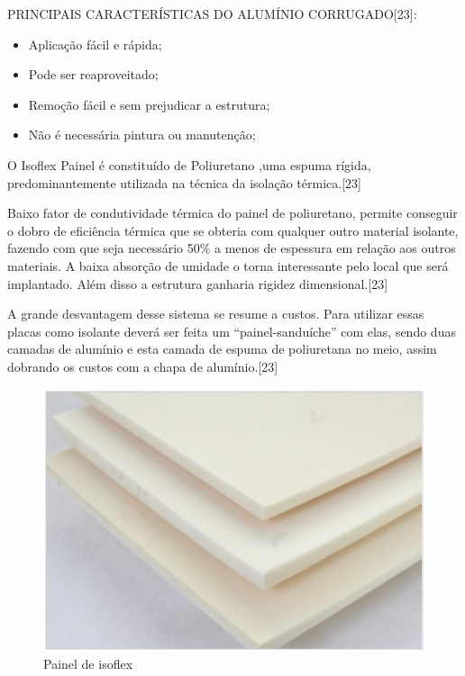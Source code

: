 PRINCIPAIS CARACTERÍSTICAS DO ALUMÍNIO CORRUGADO[23]:
\begin{itemize}
  \item Aplicação fácil e rápida;
  \item Pode ser reaproveitado;
  \item Remoção fácil e sem prejudicar a estrutura;
  \item Não é necessária pintura ou manutenção;
\end{itemize}


O Isoflex Painel é constituído de Poliuretano ,uma espuma rígida, predominantemente utilizada na técnica da isolação térmica.[23]

Baixo fator de condutividade térmica do painel de poliuretano, permite conseguir o dobro de eficiência térmica que se obteria com qualquer outro material isolante, fazendo com que seja necessário 50\% a menos de espessura em relação aos outros materiais. A baixa absorção de umidade o torna interessante pelo local que será implantado. Além disso a estrutura ganharia rigidez dimensional.[23]

A grande desvantagem desse sistema se resume a custos. Para utilizar essas placas como isolante deverá ser feita um “painel-sanduíche” com elas, sendo duas camadas de alumínio e esta camada de espuma de poliuretana no meio, assim dobrando os custos com a chapa de alumínio.[23]

\begin{figure}[H]
 \centering
   \includegraphics[keepaspectratio=true,scale=0.8]{figuras/isoflex.eps}
 \caption{Painel de isoflex}
 \label{isoflex}
\end{figure}

